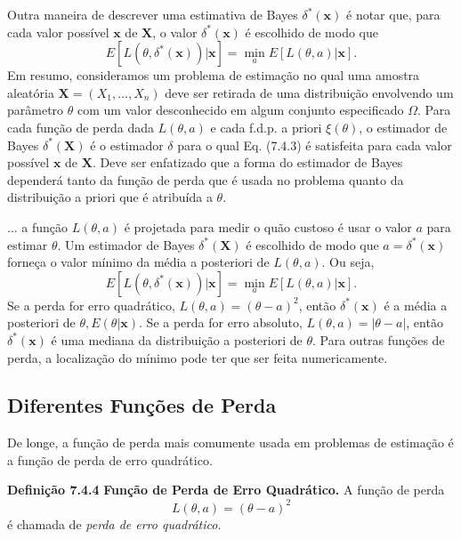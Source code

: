 \vspace{1cm}
Outra maneira de descrever uma estimativa de Bayes $\delta^*(\mathbf{x})$ é notar que, para cada valor possível $\mathbf{x}$ de $\mathbf{X}$, o valor $\delta^*(\mathbf{x})$ é escolhido de modo que
\begin{equation}
E[L(\theta, \delta^*(\mathbf{x}))|\mathbf{x}] = \min_{a} E[L(\theta, a)|\mathbf{x}]. \tag{7.4.3}
\end{equation}
Em resumo, consideramos um problema de estimação no qual uma amostra aleatória $\mathbf{X}=(X_1, \dots, X_n)$ deve ser retirada de uma distribuição envolvendo um parâmetro $\theta$ com um valor desconhecido em algum conjunto especificado $\Omega$. Para cada função de perda dada $L(\theta, a)$ e cada f.d.p. a priori $\xi(\theta)$, o estimador de Bayes $\delta^*(\mathbf{X})$ é o estimador $\delta$ para o qual Eq. (7.4.3) é satisfeita para cada valor possível $\mathbf{x}$ de $\mathbf{X}$. Deve ser enfatizado que a forma do estimador de Bayes dependerá tanto da função de perda que é usada no problema quanto da distribuição a priori que é atribuída a $\theta$.

... a função $L(\theta, a)$ é projetada para medir o quão custoso é usar o valor $a$ para estimar $\theta$. Um estimador de Bayes $\delta^*(\mathbf{X})$ é escolhido de modo que $a=\delta^*(\mathbf{x})$ forneça o valor mínimo da média a posteriori de $L(\theta, a)$. Ou seja,
$$ E[L(\theta, \delta^*(\mathbf{x}))|\mathbf{x}] = \min_a E[L(\theta, a)|\mathbf{x}]. $$
Se a perda for erro quadrático, $L(\theta, a) = (\theta-a)^2$, então $\delta^*(\mathbf{x})$ é a média a posteriori de $\theta, E(\theta|\mathbf{x})$. Se a perda for erro absoluto, $L(\theta, a) = |\theta-a|$, então $\delta^*(\mathbf{x})$ é uma mediana da distribuição a posteriori de $\theta$. Para outras funções de perda, a localização do mínimo pode ter que ser feita numericamente.

\subsection*{Diferentes Funções de Perda}
De longe, a função de perda mais comumente usada em problemas de estimação é a função de perda de erro quadrático.

\vspace{1cm}
\noindent\textbf{Definição 7.4.4} \quad \textbf{Função de Perda de Erro Quadrático.} A função de perda
\begin{equation}
L(\theta, a) = (\theta-a)^2 \tag{7.4.4}
\end{equation}
é chamada de \textit{perda de erro quadrático}.

